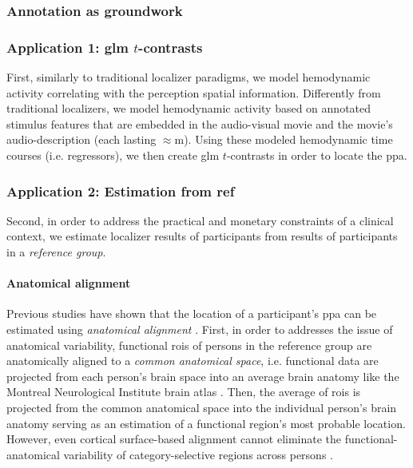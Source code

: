\subsubsection{Annotation as groundwork}

\subsubsection{Application 1: \ac{glm} $t$-contrasts}



First, similarly to traditional localizer paradigms, we model hemodynamic
activity correlating with the perception spatial information.
Differently from traditional localizers, we model hemodynamic activity based on
annotated stimulus features that are embedded in the audio-visual movie and the
movie's audio-description (each lasting $\approx$\unit[120]{m}).
Using these modeled hemodynamic time courses (i.e. regressors), we then create
\ac{glm} $t$-contrasts in order to locate the \ac{ppa}.


\subsubsection{Application 2: Estimation from ref}



Second, in order to address the practical and monetary constraints of a clinical
context, we estimate localizer results of participants from results of
participants in a \textit{reference group}.


\paragraph{Anatomical alignment}
Previous studies have shown that the location of a participant's \ac{ppa} can be
estimated using \textit{anatomical alignment} \citep{frost2012measuring,
rosenke2021probabilistic, weiner2018defining, zhen2017quantifying}.
%
First, in order to addresses the issue of anatomical variability, functional
\acp{roi} of persons in the reference group are anatomically aligned to a
\textit{common anatomical space}, i.e. functional data are projected from each
person's brain space into an average brain anatomy like the Montreal
Neurological Institute brain atlas \citep[MNI152][]{fonov2011unbiased}.
%
Then, the average of \acp{roi} is projected from the common anatomical space
into the individual person's brain anatomy serving as an estimation of a
functional region's most probable location.
%
However, even cortical surface-based alignment \citep{fischl1999cortical,
yeo2009spherical} cannot eliminate the functional-anatomical variability of
category-selective regions across persons \citep{frost2012measuring,
weiner2018defining, weiner2014mid}.


